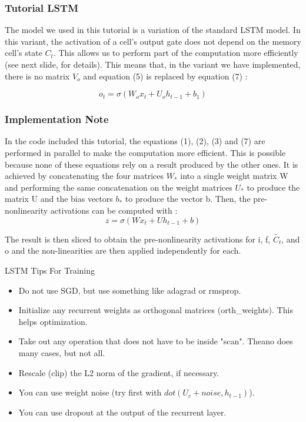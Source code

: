 \documentclass[utf8x,xcolor=pdftex,dvipsnames,table]{beamer}
\begin{document}
\begin{frame}
  \frametitle{Tutorial LSTM}
The model we used in this tutorial is a variation of the standard LSTM model. In this variant, the activation of a cell’s output gate does not depend on the memory cell’s state $C_t$. This allows us to perform part of the computation more efficiently (see next slide, for details). This means that, in the variant we have implemented, there is no matrix $V_o$ and equation (5) is replaced by equation (7) :

\begin{equation}
o_t = \sigma(W_o x_t + U_o h_{t-1} + b_1)
\end{equation}

\end{frame}

\begin{frame}
  \frametitle{Implementation Note}
In the code included this tutorial, the equations (1), (2), (3) and (7) are performed in parallel to make the computation more efficient. This is possible because none of these equations rely on a result produced by the other ones. It is achieved by concatenating the four matrices $W_*$ into a single weight matrix W and performing the same concatenation on the weight matrices $U_*$ to produce the matrix U and the bias vectors $b_*$ to produce the vector b. Then, the pre-nonlinearity activations can be computed with :
\vspace{-1em}
\begin{equation*}
z = \sigma(W x_t + U h_{t-1} + b)
\end{equation*}
\vspace{-2em} %

The result is then sliced to obtain the pre-nonlinearity activations for i, f, $\widetilde{C_t}$, and o and the non-linearities are then applied independently for each.
\end{frame}

\begin{frame}{LSTM Tips For Training}
\begin{itemize}
\item Do not use SGD, but use something like adagrad or rmsprop.
\item Initialize any recurrent weights as orthogonal matrices (orth\_weights). This helps optimization.
\item Take out any operation that does not have to be inside "scan".
      Theano does many cases, but not all.
\item Rescale (clip) the L2 norm of the gradient, if necessary.
\item You can use weight noise (try first with $dot(U_c+noise, h_{t-1})$).
\item You can use dropout at the output of the recurrent layer.
\end{itemize}
\end{frame}
\end{document}
